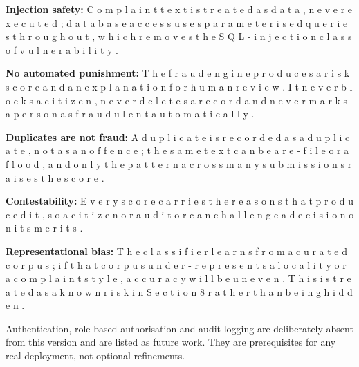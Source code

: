 \documentclass[10pt,letterpaper,oneside]{article}\usepackage{geometry}\geometry{top=1in,bottom=1in,left=1in,right=1in,includeheadfoot}\usepackage{xcolor}\definecolor{color@navy}{HTML}{1F3B63}\definecolor{color@grey}{HTML}{404040}\definecolor{color@hdr}{HTML}{F2F4F7}\usepackage{titlesec}\titleformat{\section}  {\normalfont\huge\bfseries\color@navy}  {}{0pt}{\MakeUppercase}\titleformat{\subsection}  {\normalfont\Large\bfseries\color@navy}  {}{0pt}{}\titleformat{\subsubsection}  {\normalfont\large\bfseries\color@navy}  {}{0pt}{}\titlespacing*{\section}{0pt}{14pt}{6pt}\titlespacing*{\subsection}{0pt}{10pt}{4pt}\titlespacing*{\subsubsection}{0pt}{8pt}{3pt}\setlength{\parindent}{0pt}\setlength{\parskip}{0.6em}\parindent=0pt\usepackage{enumitem}\setlist{nosep,leftmargin=*,itemsep=0pt,topsep=2pt,partopsep=0pt}\usepackage{array}\usepackage{booktabs}\usepackage{caption}\captionsetup{font={small,it},labelfont={bf},labelsep=period,  parskip=2pt,skip=4pt,list=no}\captionsetup[table]{labelfont={bf,small,color@navy},name=Table}\usepackage{graphicx}\usepackage{verbatim}\usepackage{ragged2e}\usepackage{longtable}\usepackage{tabularx}\usepackage{multirow}\usepackage{colortbl}\definecolor{rowshade}{HTML}{F2F4F7}\usepackage{tikz}\usetikzlibrary{positioning,calc}\usepackage[hidelinks]{hyperref}\hypersetup{colorlinks=true,linkcolor=color@navy,urlcolor=color@navy}\pagestyle{fancy}\fancyhf{}\renewcommand{\headrulewidth}{0.4pt}\fancyhead[L]{\small\color@navy CivicSense — Project Report}\fancyhead[R]{\small\color@grey October 11, 2026}\fancyfoot[C]{\small\color@grey An Integrated Intelligent Triage Pipelin}\fancyfoot[R]{\small\color@grey Page \thepage}\usepackage{setspace}\setstretch{1.15}\AtBeginDocument{  \hypersetup{pdftitle={An Integrated Intelligent Triage Pipeline for AI-Enhanced Citizen Complaint Management},    pdfauthor={CivicSense Project Team},    pdfsubject={Project Report},    pdfkeywords={smart cities, NLP, complaint management, e-governance},    pdfcreator={CivicSense Project Team}  }}
\begin{document}
\item \textbf{Injection safety: } C o m p l a i n t   t e x t   i s   t r e a t e d   a s   d a t a ,   n e v e r   e x e c u t e d ;   d a t a b a s e   a c c e s s   u s e s   p a r a m e t e r i s e d   q u e r i e s   t h r o u g h o u t ,   w h i c h   r e m o v e s   t h e   S Q L - i n j e c t i o n   c l a s s   o f   v u l n e r a b i l i t y .

\item \textbf{No automated punishment: } T h e   f r a u d   e n g i n e   p r o d u c e s   a   r i s k   s c o r e   a n d   a n   e x p l a n a t i o n   f o r   h u m a n   r e v i e w .   I t   n e v e r   b l o c k s   a   c i t i z e n ,   n e v e r   d e l e t e s   a   r e c o r d   a n d   n e v e r   m a r k s   a   p e r s o n   a s   f r a u d u l e n t   a u t o m a t i c a l l y .

\item \textbf{Duplicates are not fraud: } A   d u p l i c a t e   i s   r e c o r d e d   a s   a   d u p l i c a t e ,   n o t   a s   a n   o f f e n c e ;   t h e   s a m e   t e x t   c a n   b e   a   r e - f i l e   o r   a   f l o o d ,   a n d   o n l y   t h e   p a t t e r n   a c r o s s   m a n y   s u b m i s s i o n s   r a i s e s   t h e   s c o r e .

\item \textbf{Contestability: } E v e r y   s c o r e   c a r r i e s   t h e   r e a s o n s   t h a t   p r o d u c e d   i t ,   s o   a   c i t i z e n   o r   a u d i t o r   c a n   c h a l l e n g e   a   d e c i s i o n   o n   i t s   m e r i t s .

\item \textbf{Representational bias: } T h e   c l a s s i f i e r   l e a r n s   f r o m   a   c u r a t e d   c o r p u s ;   i f   t h a t   c o r p u s   u n d e r - r e p r e s e n t s   a   l o c a l i t y   o r   a   c o m p l a i n t   s t y l e ,   a c c u r a c y   w i l l   b e   u n e v e n .   T h i s   i s   t r e a t e d   a s   a   k n o w n   r i s k   i n   S e c t i o n   8   r a t h e r   t h a n   b e i n g   h i d d e n .

Authentication, role-based authorisation and audit logging are deliberately absent from this version and are listed as future work. They are prerequisites for any real deployment, not optional refinements.
\end{document}
